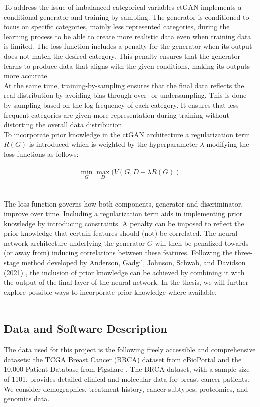 \documentclass[review,12pt]{elsarticle}
\begin{document}
To address the issue of imbalanced categorical variables ctGAN implements a conditional generator and training-by-sampling. The generator is conditioned to focus on specific categories, mainly less represented categories, during the learning process to be able to create more realistic data even when training data is limited. The loss function includes a penalty for the generator when its output does not match the desired category. This penalty ensures that the generator learns to produce data that aligns with the given conditions, making its outputs more accurate.\\ At the same time, training-by-sampling ensures that the final data reflects the real distribution by avoiding bias through over- or undersampling. This is done by sampling based on the log-frequency of each category. It ensures that less frequent categories are given more representation during training without distorting the overall data distribution. 
\\
To incorporate prior knowledge in the ctGAN architecture a regularization term $R(G)$ is introduced which is weighted by the hyperparameter $\lambda$ modifying the loss functions as follows:
\\
\\
\begin{equation} \label{eu_eqn}
\min_G \max_D (V(G, D + \lambda R(G))
\end{equation}
\\
\\
The loss function governs how both components, generator and discriminator, improve over time. Including a regularization term aids in implementing prior knowledge by introducing constraints. A penalty can be imposed to reflect the prior knowledge that certain features should (not) be correlated. The neural network architecture underlying the generator $G$ will then be penalized towards (or away from) inducing correlations between these features. Following the three-stage method developed by Anderson, Gadgil, Johnson, Schwab, and Davidson (2021) \cite{ANDERSON2021104850}, the inclusion of prior knowledge can be achieved by combining it with the output of the final layer of the neural network. In the thesis, we will further explore possible ways to incorporate prior knowledge where available. 
\\
\\
\subsection{Data and Software Description}
The data used for this project is the following freely accessible and comprehensive datasets: the TCGA Breast Cancer (BRCA) dataset from cBioPortal \cite{lingle2016tcgabrca} and the 10,000-Patient Database from Figshare \cite{Kartoun2018}. The BRCA dataset, with a sample size of 1101, provides detailed clinical and molecular data for breast cancer patients. We consider demographics, treatment history, cancer subtypes, proteomics, and genomics data. 
\\
\end{document}
